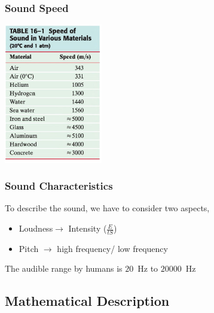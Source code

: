 \documentclass[]{beamer}
\begin{document}

\begin{frame}
\frametitle{Sound Speed}


  \begin{center}
  \includegraphics[height=2.4in]{images4/sound_speed.jpg}
\end{center}




  \end{frame}


\begin{frame}
\frametitle{Sound Characteristics}

To describe the sound, we have to consider two aspects,
\vspace{5mm}

\pause

\begin{itemize}
\item Loudness$\rightarrow$ Intensity ($\frac{E}{tS}$)
\pause

\item Pitch $\rightarrow$  high frequency/ low frequency
\end{itemize}

\pause

\vspace{3mm}

The audible range by humans  is $20$~Hz to $20000$~Hz

  \end{frame}

\subsection{Mathematical Description}
\end{document}
